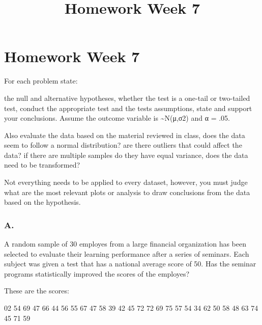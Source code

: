 \documentclass[11pt]{article}
\title{Homework Week 7}
\begin{document}
    
    
    \maketitle
    
    

    
    \hypertarget{homework-week-7}{%
\section{Homework Week 7}\label{homework-week-7}}

For each problem state:

the null and alternative hypotheses, whether the test is a one-tail or
two-tailed test, conduct the appropriate test and the tests assumptions,
state and support your conclusions. Assume the outcome variable is
\textasciitilde{}N(μ,σ2) and α = .05.

Also evaluate the data based on the material reviewed in class, does the
data seem to follow a normal distribution? are there outliers that could
affect the data? if there are multiple samples do they have equal
variance, does the data need to be transformed?

Not everything needs to be applied to every dataset, however, you must
judge what are the most relevant plots or analysis to draw conclusions
from the data based on the hypothesis.

    \hypertarget{a.}{%
\subsubsection{A.}\label{a.}}

A random sample of 30 employes from a large financial organization has
been selected to evaluate their learning performance after a series of
seminars. Each subject was given a test that has a national average
score of 50. Has the seminar programs statistically improved the scores
of the employes?

These are the scores:

02 54 69 47 66 44 56 55 67 47 58 39 42 45 72 72 69 75 57 54 34 62 50 58
48 63 74 45 71 59
\end{document}
